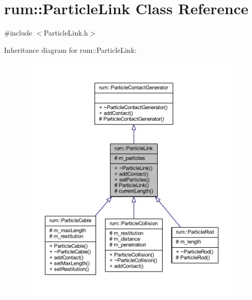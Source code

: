\hypertarget{classrum_1_1_particle_link}{}\section{rum\+:\+:Particle\+Link Class Reference}
\label{classrum_1_1_particle_link}


{\ttfamily \#include $<$Particle\+Link.\+h$>$}



Inheritance diagram for rum\+:\+:Particle\+Link\+:\nopagebreak
\begin{figure}[H]
\begin{center}
\leavevmode
\includegraphics[width=350pt]{classrum_1_1_particle_link__inherit__graph}
\end{center}
\end{figure}


